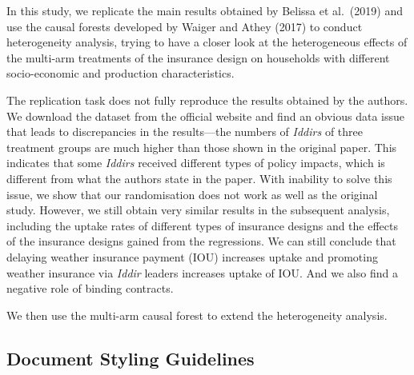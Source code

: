 \documentclass[AER]{AEA}
\begin{document}
In this study, we replicate the main results obtained by Belissa et
al.~(2019) and use the causal forests developed by Waiger and Athey
(2017) to conduct heterogeneity analysis, trying to have a closer look
at the heterogeneous effects of the multi-arm treatments of the
insurance design on households with different socio-economic and
production characteristics.

The replication task does not fully reproduce the results obtained by
the authors. We download the dataset from the official website and find
an obvious data issue that leads to discrepancies in the results---the
numbers of \textit{Iddirs} of three treatment groups are much higher
than those shown in the original paper. This indicates that some
\textit{Iddirs} received different types of policy impacts, which is
different from what the authors state in the paper. With inability to
solve this issue, we show that our randomisation does not work as well
as the original study. However, we still obtain very similar results in
the subsequent analysis, including the uptake rates of different types
of insurance designs and the effects of the insurance designs gained
from the regressions. We can still conclude that delaying weather
insurance payment (IOU) increases uptake and promoting weather insurance
via \textit{Iddir} leaders increases uptake of IOU. And we also find a
negative role of binding contracts.

We then use the multi-arm causal forest to extend the heterogeneity
analysis.

\hypertarget{document-styling-guidelines}{%
\subsection{Document Styling
Guidelines}\label{document-styling-guidelines}}
\end{document}
